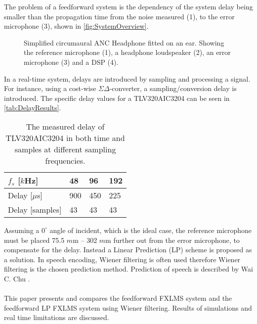 The problem of a feedforward system is the dependency of the system delay being smaller than the propagation time from the noise measured (1), to the error microphone (3), shown in \autoref{fig:SystemOverview}.
\begin{figure}[H]
	\centering
	
	\caption{Simplified circumaural ANC Headphone fitted on an ear. Showing the reference microphone (1), a headphone loudspeaker (2), an error microphone (3) and a DSP (4).}
	\label{fig:SystemOverview}
\end{figure}
In a real-time system, delays are introduced by sampling and processing a signal. For instance, using a cost-wise $\Sigma\Delta$-converter, a sampling/conversion delay is introduced. The specific delay values for a TLV320AIC3204 can be seen in \autoref{tab:DelayResults}.




\begin{table}[H]
	\centering
	\begin{tabular}{|l|l|l|l|}
	\hline
	$f_s$ {[}$k$Hz{]} & 48 & 96 & 192 \\ \hline
	Delay {[}$\mu$s{]} & 900 & 450 & 225 \\ \hline
	Delay {[}samples{]} & 43 & 43 & 43 \\ \hline
\end{tabular}
	\caption{The measured delay of TLV320AIC3204 in both time and samples at different sampling frequencies.}
	\label{tab:DelayResults}
\end{table}

Assuming a $\text{0}^{\circ}$ angle of incident, which is the ideal case, the reference microphone must be placed 75.5 $m$m -- 302 $m$m further out from the error microphone, to compensate for the delay. Instead a Linear Prediction (LP) scheme is proposed as a solution. In speech encoding, Wiener filtering is often used \cite{Speech} therefore Wiener filtering is the chosen prediction method.
Prediction of speech is described by Wai C. Chu \cite{Speech}. 
\\\\
This paper presents and compares the feedforward FXLMS system and the feedforward LP FXLMS system using Wiener filtering. Results of simulations and real time limitations are discussed.  
        
